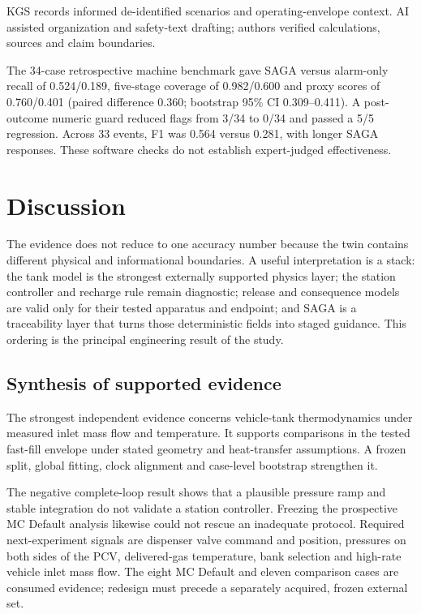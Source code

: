 \documentclass[12pt,a4paper]{article}
\begin{document}
KGS records informed de-identified scenarios and operating-envelope context.
AI assisted organization and safety-text drafting; authors verified calculations,
sources and claim boundaries.

The 34-case retrospective machine benchmark gave SAGA versus alarm-only recall
of 0.524/0.189, five-stage coverage of 0.982/0.600 and proxy scores of
0.760/0.401 (paired difference 0.360; bootstrap 95\% CI 0.309--0.411). A post-
outcome numeric guard reduced flags from 3/34 to 0/34 and passed a 5/5 regression.
Across 33 events, F1 was 0.564 versus 0.281, with longer SAGA responses. These
software checks do not establish expert-judged effectiveness.

\section{Discussion}
The evidence does not reduce to one accuracy number because the twin contains
different physical and informational boundaries. A useful interpretation is a
stack: the tank model is the strongest externally supported physics layer; the
station controller and recharge rule remain diagnostic; release and consequence
models are valid only for their tested apparatus and endpoint; and SAGA is a
traceability layer that turns those deterministic fields into staged guidance.
This ordering is the principal engineering result of the study.

\subsection{Synthesis of supported evidence}
The strongest independent evidence concerns vehicle-tank thermodynamics under
measured inlet mass flow and temperature. It supports comparisons in the tested
fast-fill envelope under stated geometry and heat-transfer assumptions. A frozen
split, global fitting, clock alignment and case-level bootstrap strengthen it.

The negative complete-loop result shows that a plausible pressure ramp and stable
integration do not validate a station controller. Freezing the prospective MC
Default analysis likewise could not rescue an inadequate protocol. Required
next-experiment signals are dispenser valve command and position, pressures on
both sides of the PCV, delivered-gas temperature, bank selection and high-rate
vehicle inlet mass flow. The eight MC Default and eleven comparison cases are
consumed evidence; redesign must precede a separately acquired, frozen external
set.
\end{document}
